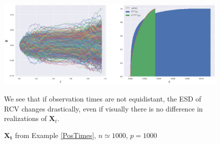 \documentclass[a4paper,11pt]{article}
\theoremstyle{plain}
\theoremstyle{definition}
\begin{document}
    \begin{figure}
    	\begin{center} \centering
    		\includegraphics[scale=0.4]{Xcostimes}
    		\caption{ $\mathbf{X_t}$ from Example \ref{PosTimes}, $n \simeq 1000$, $p=1000$ }
    		\smallskip
    		\small
    		We see that if observation times are not equidistant, the ESD of RCV changes drastically, even if visually there is no difference in realizations of $\mathbf{X}_t$.
    	\end{center}
    \end{figure}
    
    
\end{document}

